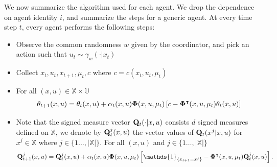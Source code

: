 \documentclass[twoside,11pt]{article}
\begin{document}
We now summarize the algorithm used for each agent.  We drop the dependence on agent identity $i$, and summarize the steps for a generic agent. At every time step $t$, every agent performs the following steps:
\begin{itemize}
\item Observe the common randomness $w$ given by the coordinator, and pick an action such that $u_t\sim \gamma_w(\cdot|x_t)$
\item Collect $x_t,u_t,x_{t+1},\mu_t,c$ where $c=c(x_t,u_t,\mu_t)$
\item For all $(x,u)\in\mathds{X}\times\mathds{U}$
\begin{align}\label{ind_learn1}
{\bf \theta}_{t+1}(x,u) = {\bf \theta}_t(x,u) + \alpha_t(x,u){\bf \Phi}(x,u,\mu_t)\left[c-{\bf \Phi}^\intercal(x,u,\mu_t) {\bf \theta}_t(x,u)\right]
\end{align}
\item Note that the signed measure vector ${\bf Q}_t(\cdot|x,u)$ consists $d$ signed measures defined on $\mathds{X}$, we denote by ${\bf Q}^j_t(x,u)$ the vector values of  ${\bf Q}_t(x^j|x,u)$ for $x^j\in \mathds{X}$ where $j\in\{1\dots,|\mathds{X}|\}$. For all $(x,u)$ and $j\in\{1\dots,|\mathds{X}|\}$
\begin{align}\label{ind_learn2}
{\bf Q}_{t+1}^j(x,u) = {\bf Q}_t^j(x,u) + \alpha_t(x,u) {\bf \Phi}(x,u,\mu_t)\left[\mathds{1}_{\{x_{t+1}=x^j\}} - {\bf \Phi}^\intercal(x,u,\mu_t) {\bf Q}_t^j(x,u) \right].
\end{align}

\end{itemize}
\end{document}
